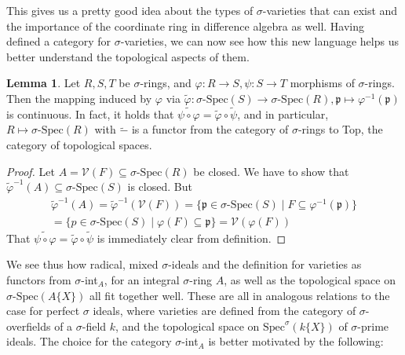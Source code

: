 \documentclass{article}
\def\V{\mathcal{V}}
\def\p{\mathfrak{p}}
\def\s{\sigma}
\def\Spec{\text{Spec}}
\def\sSpec{\sigma\text{-Spec}}
\newenvironment{bew}{\begin{proof}[Proof]}{\end{proof}}
\theoremstyle{definition}
\newtheorem{lem}[Satz]{Lemma}
\begin{document}
This gives us a pretty good idea about the types of $\s$-varieties that can exist and the importance of the coordinate ring in difference algebra as well. 
Having defined a category for $\s$-varieties, we can now see how this new language helps us better understand the topological aspects of them.

\begin{lem}\label{inducedcont}
Let $R,S,T$ be $\s$-rings, and $\varphi: R \rightarrow S, \psi: S \rightarrow T$ morphisms of $\s$-rings. Then the mapping induced by $\varphi$ via $\tilde \varphi: \sSpec(S) \rightarrow \sSpec(R), \p \mapsto \varphi^{-1}(\p)$ is continuous. 
In fact, it holds that $\widetilde{ \psi \circ \varphi} = \tilde \varphi \circ \tilde \psi$, and in particular, $R \mapsto \sSpec(R)$ with $\tilde -$ is a functor from the category of $\s$-rings to Top, the category of topological spaces.
\begin{bew}
Let $A = \V(F) \subseteq \sSpec(R)$ be closed. We have to show that $\tilde \varphi^{-1}(A) \subseteq \sSpec(S)$ is closed.
But 
\begin{align*} \tilde \varphi^{-1}(A) = \tilde \varphi^{-1}(\V(F)) = \{ \p \in \sSpec(S) \mid F \subseteq \varphi^{-1}(\p) \} \\ = \{p \in \sSpec(S) \mid \varphi(F) \subseteq \p \} = \V(\varphi(F)) \end{align*}
That $\widetilde{ \psi \circ \varphi} = \tilde \varphi \circ \tilde \psi$ is immediately clear from definition.
\end{bew}
\end{lem}

We see thus how radical, mixed $\s$-ideals and the definition for varieties as functors from $\s$-int$_A$, for an integral $\s$-ring $A$, as well as the topological space on $\sSpec(A\{X\})$ all fit together well. 
These are all in analogous relations to the case for perfect $\s$ ideals, where varieties are defined from the category of $\s$-overfields of a $\s$-field $k$, and the topological space on $\Spec^\s(k\{X\})$ of $\s$-prime ideals.
The choice for the category $\s$-int$_A$ is better motivated by the following:
\end{document}
